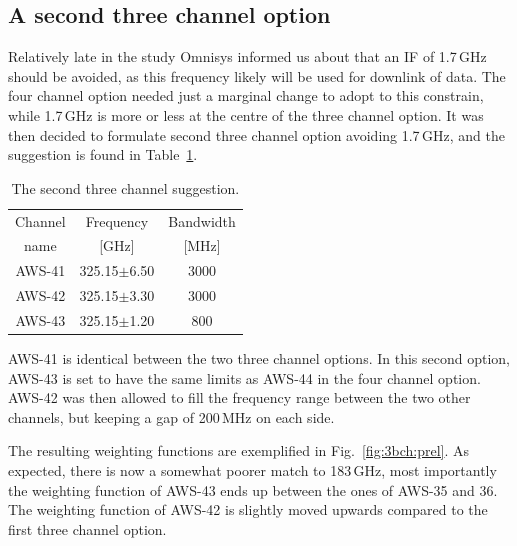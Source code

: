 \documentclass[12pt]{article}
\begin{document}
\subsection{A second three channel option}
%
Relatively late in the study Omnisys informed us about that an IF of 1.7\,GHz
should be avoided, as this frequency likely will be used for downlink of data.
The four channel option needed just a marginal change to adopt to this
constrain, while 1.7\,GHz is more or less at the centre of the three channel
option. It was then decided to formulate second three channel option avoiding 
1.7\,GHz, and the suggestion is found in Table~\ref{tab:chs:3b}.

\begin{table}[!h]
  \centering  
  \begin{tabular}[c]{c|c|c}
    Channel & Frequency   & Bandwidth \\
    name    & [GHz] &  [MHz] \\
    \hline
    AWS-41  & 325.15$\pm$6.50 & 3000\\
    AWS-42  & 325.15$\pm$3.30 & 3000\\
    AWS-43  & 325.15$\pm$1.20 & \phantom{0}800\\
    \hline
  \end{tabular}
  \caption{The second three channel suggestion.}
  \label{tab:chs:3b}
\end{table}

AWS-41 is identical between the two three channel options. In this second
option, AWS-43 is set to have the same limits as AWS-44 in the four channel
option. AWS-42 was then allowed to fill the frequency range between the two
other channels, but keeping a gap of 200\,MHz on each side.

The resulting weighting functions are exemplified in Fig.~\ref{fig:3bch:prel}.
As expected, there is now a somewhat poorer match to 183\,GHz, most importantly
the weighting function of AWS-43 ends up between the ones of AWS-35 and 36. The
weighting function of AWS-42 is slightly moved upwards compared to the first
three channel option.
\end{document}
